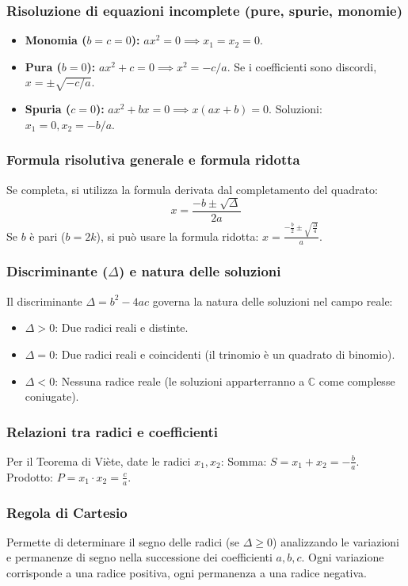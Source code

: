 \subsubsection{Risoluzione di equazioni incomplete (pure, spurie, monomie)}
\begin{itemize}
    \item \textbf{Monomia ($b=c=0$):} $ax^2 = 0 \implies x_1=x_2=0$.
    \item \textbf{Pura ($b=0$):} $ax^2 + c = 0 \implies x^2 = -c/a$. Se i coefficienti sono discordi, $x = \pm \sqrt{-c/a}$.
    \item \textbf{Spuria ($c=0$):} $ax^2 + bx = 0 \implies x(ax+b)=0$. Soluzioni: $x_1=0, x_2=-b/a$.
\end{itemize}

\subsubsection{Formula risolutiva generale e formula ridotta}
Se completa, si utilizza la formula derivata dal completamento del quadrato:
\[ x = \frac{-b \pm \sqrt{\Delta}}{2a} \]
Se $b$ è pari ($b = 2k$), si può usare la formula ridotta: $x = \frac{-\frac{b}{2} \pm \sqrt{\frac{\Delta}{4}}}{a}$.

\subsubsection{Discriminante ($\Delta$) e natura delle soluzioni}
Il discriminante $\Delta = b^2 - 4ac$ governa la natura delle soluzioni nel campo reale:
\begin{itemize}
    \item $\Delta > 0$: Due radici reali e distinte.
    \item $\Delta = 0$: Due radici reali e coincidenti (il trinomio è un quadrato di binomio).
    \item $\Delta < 0$: Nessuna radice reale (le soluzioni apparterranno a $\mathbb{C}$ come complesse coniugate).
\end{itemize}

\subsubsection{Relazioni tra radici e coefficienti}
Per il Teorema di Viète, date le radici $x_1, x_2$:
Somma: $S = x_1 + x_2 = -\frac{b}{a}$. \quad Prodotto: $P = x_1 \cdot x_2 = \frac{c}{a}$.

\subsubsection{Regola di Cartesio}
Permette di determinare il segno delle radici (se $\Delta \ge 0$) analizzando le variazioni e permanenze di segno nella successione dei coefficienti $a, b, c$.
Ogni variazione corrisponde a una radice positiva, ogni permanenza a una radice negativa.


